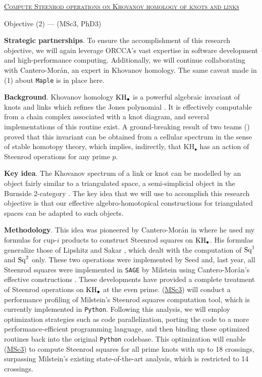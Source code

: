 
\smallskip
{\centering \underline{\textsc{Compute Steenrod operations on Khovanov homology of knots and links}}\par}
{\centering Objective (2) \hspace*{2cm} --- \hspace*{2cm} (MSc3, PhD3)\par}

\smallskip\textbf{Strategic partnerships}.
To ensure the accomplishment of this research objective, we will again leverage ORCCA's vast expertise in software development and high-performance computing.
Additionally, we will continue collaborating with Cantero-Mor\'an, an expert in Khovanov homology.
The same caveat made in (1) about \texttt{Maple} is in place here.

\smallskip\textbf{Background}.
Khovanov homology $\mathrm{KH}_\bullet$ is a powerful algebraic invariant of knots and links which refines the Jones polynomial \cite{khovanov2000khovanov}.
It is effectively computable from a chain complex associated with a knot diagram, and several implementations of this routine exist.
A ground-breaking result of two teams (\cite{lipshitz2014khovanov, kriz2016khovanov}) proved that this invariant can be obtained from a cellular spectrum in the sense of stable homotopy theory, which implies, indirectly, that $\mathrm{KH_\bullet}$ has an action of Steenrod operations for any prime $p$.

\smallskip\textbf{Key idea}.
The Khovanov spectrum of a link or knot can be modelled by an object fairly similar to a triangulated space, a semi-simplicial object in the Burnside 2-category \cite{lawson2020khovanov}.
The key idea that we will use to accomplish this research objective is that our effective algebro-homotopical constructions for triangulated spaces can be adapted to such objects.

\smallskip\noindent\textbf{Methodology}.
This idea was pioneered by Cantero-Mor\'an in \cite{cantero-moran2020khovanov} where he used my formulas for cup-$i$ products \cite{medina2023fast_sq} to construct Steenrod squares on $\mathrm{KH}_\bullet$.
His formulas generalize those of Lipshitz and Sakar \cite{lipshitz2014steenrod}, which dealt with the computation of $\operatorname{Sq}^1$ and $\operatorname{Sq}^2$ only.
These two operations were implemented by Seed \cite{seed2012khovanov} and, last year, all Steenrod squares were implemented in \texttt{SAGE} by Milstein using Cantero-Mor\'an's effective constructions \cite{milstein2022khovanov}.
These developments have provided a complete treatment of Steenrod operations on $\mathrm{KH}_\bullet$ at the even prime.
(\underline{MSc3}) will conduct a performance profiling of Milstein's Steenrod squares computation tool, which is currently implemented in \texttt{Python}.
Following this analysis, we will employ optimization strategies such as code parallelization, porting the code to a more performance-efficient programming language, and then binding these optimized routines back into the original \texttt{Python} codebase.
This optimization will enable (\underline{MSc3}) to compute Steenrod squares for all prime knots with up to 18 crossings, surpassing Milstein's existing state-of-the-art analysis, which is restricted to 14 crossings.

